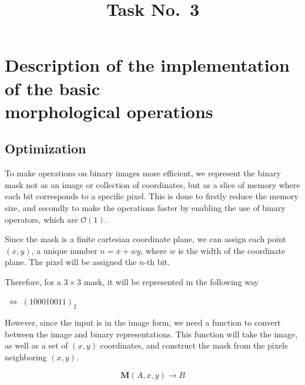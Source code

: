\documentclass[12pt]{article}
\title{Task No.~3}
\begin{document}
\maketitle

\section{Description of the implementation of the basic \texorpdfstring{\\ }{} morphological operations}

\subsection*{Optimization}

To make operations on binary images more efficient,
we represent the binary mask not as an image or collection of coordinates,
but as a slice of memory where each bit corresponds to a specific pixel.
This is done to firstly reduce the memory size, and secondly to make the operations faster by enabling the use of
binary operators, which are $\mathcal{O}(1)$.

Since the mask is a finite cartesian coordinate plane, we can assign each point $(x,y)$,
a unique number $n = x + wy$, where $w$ is the width of the coordinate plane.
The pixel will be assigned the $n$-th bit.

Therefore, for a $3\times3$ mask, it will be represented in the following way

\begin{center}
    $\; \Longleftrightarrow \; (100010011)_2$
\end{center}

\vfill

However, since the input is in the image form, we need a function to convert between the image and binary representations.
This function will take the image, as well as a set of $(x,y)$ coordinates, and construct the mask from the pixels neighboring $(x,y)$.

\begin{equation}
    \mathbf{M}(A,x,y) \to B
\end{equation}
\end{document}
